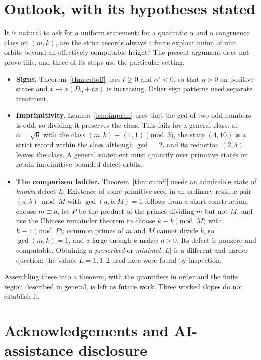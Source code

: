 \documentclass[11pt]{article}
\theoremstyle{definition}
\theoremstyle{remark}
\begin{document}
\section{Outlook, with its hypotheses stated}\label{sec:outlook}

It is natural to ask for a uniform statement: for a quadratic $\alpha$ and a congruence class on
$(m,k)$, are the strict records always a finite explicit union of unit orbits beyond an
effectively computable height? The present argument does not prove this, and three of its steps
use the particular setting.

\begin{itemize}\itemsep3pt
\item \textbf{Signs.} Theorem~\ref{thm:cutoff} uses $t\ge0$ and $\alpha'<0$, so that $\eta>0$ on
positive states and $x\mapsto x(D_0+tx)$ is increasing. Other sign patterns need separate
treatment.
\item \textbf{Imprimitivity.} Lemma~\ref{lem:imprim} uses that the gcd of two odd numbers is
odd, so dividing it preserves the class. This fails for a general class: at $\alpha=\sqrt6$ with
the class $(m,k)\equiv(1,1)\pmod3$, the state $(4,10)$ is a strict record within the class
although $\gcd=2$, and its reduction $(2,5)$ leaves the class. A general statement must quantify
over primitive states or retain imprimitive bounded-defect orbits.
\item \textbf{The comparison ladder.} Theorem~\ref{thm:cutoff} needs an admissible state of
\emph{known} defect $L$. Existence of some primitive seed in an ordinary residue pair
$(a,b)\bmod M$ with $\gcd(a,b,M)=1$ follows from a short construction: choose $m\equiv a$, let
$P$ be the product of the primes dividing $m$ but not $M$, and use the Chinese remainder theorem
to choose $k\equiv b\pmod M$ with $k\equiv1\pmod P$; common primes of $m$ and $M$ cannot divide
$b$, so $\gcd(m,k)=1$, and a large enough $k$ makes $\eta>0$. Its defect is nonzero and
computable. Obtaining a \emph{prescribed} or \emph{minimal} $|L|$ is a different and harder
question; the values $L=1,1,2$ used here were found by inspection.
\end{itemize}

Assembling these into a theorem, with the quantifiers in order and the finite region described
in general, is left as future work. Three worked slopes do not establish it.

\section*{Acknowledgements and AI-assistance disclosure}
\end{document}
